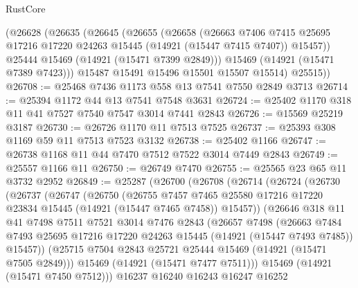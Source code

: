 \begin{lexlean}{RustCore}
\begin{coremodule}
      (@26628
        (@26635
          (@26645
            (@26655
              (@26658
                (@26663
                  @7406
                  @7415
                  @25695
                  @17216
                  @17220
                  @24263
                  @15445
                  (@14921 (@15447 @7415 @7407))
                  @15457))
              @25444
              @15469
              (@14921 (@15471 @7399 @2849)))
            @15469
            (@14921 (@15471 @7389 @7423)))
          @15487
          @15491
          @15496
          @15501
          @15507
          @15514)
        @25515))
@26708 := @25468 @7436 @1173 @558 @13 @7541 @7550 @2849 @3713
@26714 := @25394 @1172 @44 @13 @7541 @7548 @3631
@26724 := @25402 @1170 @318 @11 @41 @7527 @7540 @7547 @3014 @7441 @2843
@26726 := @15569 @25219 @3187
@26730 := @26726 @1170 @11 @7513 @7525
@26737 := @25393 @308 @1169 @59 @11 @7513 @7523 @3132
@26738 := @25402 @1166
@26747 := @26738 @1168 @11 @44 @7470 @7512 @7522 @3014 @7449 @2843
@26749 := @25557 @1166 @11
@26750 := @26749 @7470
@26755 := @25565 @23 @65 @11 @3732 @2952
@26849 := @25287
    (@26700
      (@26708
        (@26714
          (@26724
            (@26730
              (@26737
                (@26747
                  (@26750
                    (@26755
                      @7457
                      @7465
                      @25580
                      @17216
                      @17220
                      @23834
                      @15445
                      (@14921 (@15447 @7465 @7458))
                      @15457))
                  (@26646
                    @318
                    @11
                    @41
                    @7498
                    @7511
                    @7521
                    @3014
                    @7476
                    @2843
                    (@26657
                      @7498
                      (@26663
                        @7484
                        @7493
                        @25695
                        @17216
                        @17220
                        @24263
                        @15445
                        (@14921 (@15447 @7493 @7485))
                        @15457))
                    (@25715 @7504 @2843 @25721 @25444 @15469 (@14921 (@15471 @7505 @2849)))
                    @15469
                    (@14921 (@15471 @7477 @7511)))
                  @15469
                  (@14921 (@15471 @7450 @7512)))
                @16237
                @16240
                @16243
                @16247
                @16252

\end{coremodule}
\end{lexlean}

